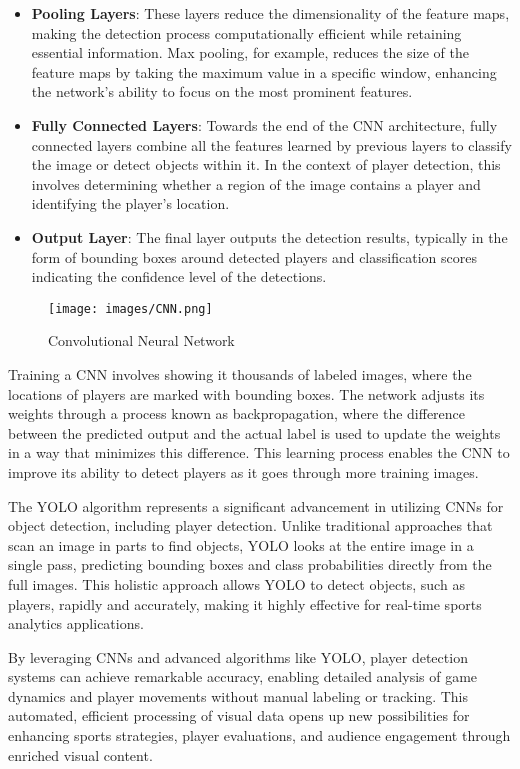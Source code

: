 \documentclass[12pt, letterpaper]{article}
\begin{document}
{\begin{spacing}{1.2}
\begin{itemize}
    \item \textbf{Pooling Layers}: These layers reduce the dimensionality of the feature maps, making the detection process computationally efficient while retaining essential information. Max pooling, for example, reduces the size of the feature maps by taking the maximum value in a specific window, enhancing the network's ability to focus on the most prominent features.

    \item \textbf{Fully Connected Layers}: Towards the end of the CNN architecture, fully connected layers combine all the features learned by previous layers to classify the image or detect objects within it. In the context of player detection, this involves determining whether a region of the image contains a player and identifying the player's location.

    \item \textbf{Output Layer}: The final layer outputs the detection results, typically in the form of bounding boxes around detected players and classification scores indicating the confidence level of the detections.
\end{itemize}

\begin{figure}[htbp]
\centering
\texttt{[image: images/CNN.png]}
\captionsetup{font=large}
\caption{Convolutional Neural Network}
\label{fig:cnn}
\end{figure}

Training a CNN involves showing it thousands of labeled images, where the locations of players are marked with bounding boxes. The network adjusts its weights through a process known as backpropagation, where the difference between the predicted output and the actual label is used to update the weights in a way that minimizes this difference. This learning process enables the CNN to improve its ability to detect players as it goes through more training images.

The YOLO algorithm represents a significant advancement in utilizing CNNs for object detection, including player detection. Unlike traditional approaches that scan an image in parts to find objects, YOLO looks at the entire image in a single pass, predicting bounding boxes and class probabilities directly from the full images. This holistic approach allows YOLO to detect objects, such as players, rapidly and accurately, making it highly effective for real-time sports analytics applications.

By leveraging CNNs and advanced algorithms like YOLO, player detection systems can achieve remarkable accuracy, enabling detailed analysis of game dynamics and player movements without manual labeling or tracking. This automated, efficient processing of visual data opens up new possibilities for enhancing sports strategies, player evaluations, and audience engagement through enriched visual content.


\end{spacing}}
\end{document}
